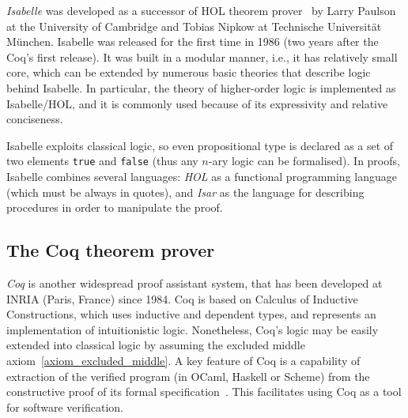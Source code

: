 \documentclass[article]{aaltoseries}
\begin{document}
\textit{Isabelle} was developed as a successor of HOL theorem prover~\cite{tool_HOL} by Larry Paulson at the University of Cambridge and Tobias Nipkow at Technische Universität München. Isabelle was released for the first time in 1986 (two years after the Coq's first release). It was built in a modular manner, i.e., it has relatively small core, which can be extended by numerous basic theories that describe logic behind Isabelle. In particular, the theory of higher-order logic is implemented as Isabelle/HOL, and it is commonly used because of its expressivity and relative conciseness. 

Isabelle exploits classical logic, so even propositional type is declared as a set of two elements \texttt{true} and \texttt{false} (thus any $n$-ary logic can be formalised). In proofs, Isabelle combines several languages: \textit{HOL} as a functional programming language (which must be always in quotes), and \textit{Isar} as the language for describing procedures in order to manipulate the proof.




\subsection{The Coq theorem prover}
\label{sec:prover_coq}

\textit{Coq} is another widespread proof assistant system, that has been developed at INRIA (Paris, France) since 1984. Coq is based on Calculus of Inductive Constructions, which uses inductive and dependent types, and represents an implementation of intuitionistic logic. Nonetheless, Coq's logic may be easily extended into classical logic by assuming the excluded middle axiom~\ref{axiom_excluded_middle}. A key feature of Coq is a capability of extraction of the verified program (in OCaml, Haskell or Scheme) from the constructive proof of its formal specification~\cite{Letouzey08}. This facilitates using Coq as a tool for software verification.
\end{document}
